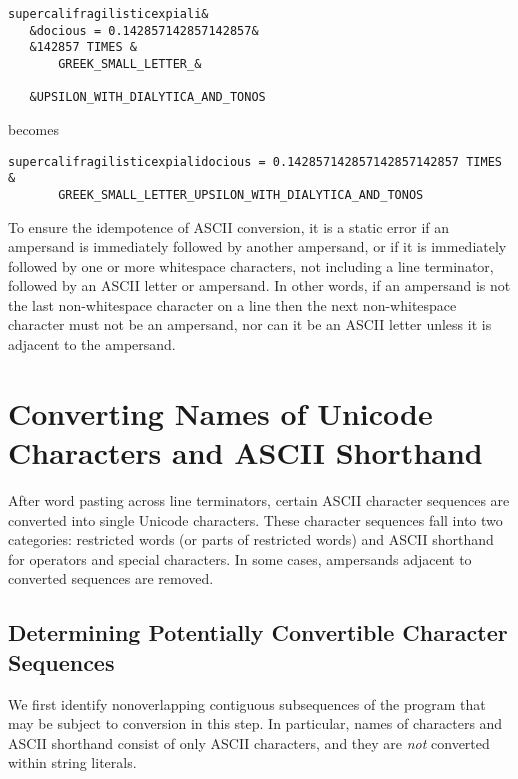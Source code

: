 \begin{verbatim}
supercalifragilisticexpiali&
   &docious = 0.142857142857142857&
   &142857 TIMES &
       GREEK_SMALL_LETTER_&

   &UPSILON_WITH_DIALYTICA_AND_TONOS
\end{verbatim}
becomes
\begin{verbatim}
supercalifragilisticexpialidocious = 0.142857142857142857142857 TIMES &
       GREEK_SMALL_LETTER_UPSILON_WITH_DIALYTICA_AND_TONOS
\end{verbatim}

To ensure the idempotence of ASCII conversion,
it is a static error if
an ampersand is immediately followed by another ampersand,
or if it is immediately followed
by one or more whitespace characters,
not including a line terminator,
followed by an ASCII letter or ampersand.
In other words,
if an ampersand is not the last non-whitespace character on a line
then the next non-whitespace character must not be an ampersand,
nor can it be an ASCII letter
unless it is adjacent to the ampersand.


\section{Converting Names of Unicode Characters and ASCII Shorthand}

After word pasting across line terminators,
certain ASCII character sequences are converted
into single Unicode characters.
These character sequences fall into two categories:
restricted words (or parts of restricted words)
and ASCII shorthand for operators and special characters.
In some cases,
ampersands adjacent to converted sequences are removed.

\subsection{Determining Potentially Convertible Character Sequences}

We first identify nonoverlapping contiguous subsequences
of the program
that may be subject to conversion in this step.
In particular,
names of characters and ASCII shorthand consist of
only ASCII characters,
and they are \emph{not} converted within string literals.

